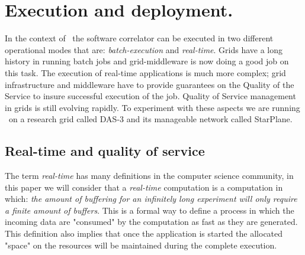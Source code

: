 \section{Execution and deployment.}\label{sec:network}
In the context of \evlbi\ the software correlator can be executed in
two different operational modes that are: \emph{batch-execution} and
\emph{real-time}. Grids have a long history in running batch jobs and
grid-middleware is now doing a good job on this task. The execution of
real-time applications is much more complex; grid infrastructure and
middleware have to provide guarantees on the Quality of the Service to
insure successful execution of the job. Quality of Service management
in grids is still evolving rapidly. To experiment with these aspects
we are running \scarie\ on a research grid called DAS-3 and its
manageable network called StarPlane.

\subsection{Real-time and quality of service}
The term \emph{real-time} has many definitions in the computer science
community, in this paper we will consider that a \emph{real-time}
computation is a computation in which: \emph{the amount of buffering
  for an infinitely long experiment will only require a finite amount
  of buffers}. This is a formal way to define a process in which the
incoming data are "consumed" by the computation as fast as they are
generated. This definition also implies that once the application is
started the allocated "space" on the resources will be maintained
during the complete execution.

